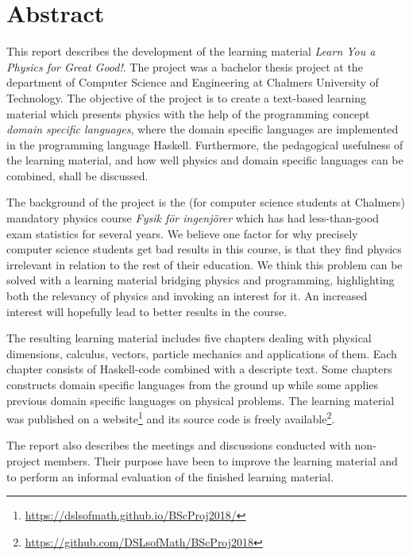 \setlength{\parskip}{0.5cm}

\thispagestyle{plain}			%
\section*{Abstract}

This report describes the development of the learning material \textit{Learn You a Physics for Great Good!}. The project was a bachelor thesis project at the department of Computer Science and Engineering at Chalmers University of Technology. The objective of the project is to create a text-based learning material which presents physics with the help of the programming concept \textit{domain specific languages}, where the domain specific languages are implemented in the programming language Haskell. Furthermore, the pedagogical usefulness of the learning material, and how well physics and domain specific languages can be combined, shall be discussed.

The background of the project is the (for computer science students at Chalmers) mandatory physics course \textit{Fysik för ingenjörer} which has had less-than-good exam statistics for several years. We believe one factor for why precisely computer science students get bad results in this course, is that they find physics irrelevant in relation to the rest of their education. We think this problem can be solved with a learning material bridging physics and programming, highlighting both the relevancy of physics and invoking an interest for it. An increased interest will hopefully lead to better results in the course.

The resulting learning material includes five chapters dealing with physical dimensions, calculus, vectors, particle mechanics and applications of them. Each chapter consists of Haskell-code combined with a descripte text. Some chapters constructs domain specific languages from the ground up while some applies previous domain specific languages on physical problems. The learning material was published on a website\footnote{\url{https://dslsofmath.github.io/BScProj2018/}} and its source code is freely available\footnote{\url{https://github.com/DSLsofMath/BScProj2018}}.

The report also describes the meetings and discussions conducted with non-project members. Their purpose have been to improve the learning material and to perform an informal evaluation of the finished learning material.

